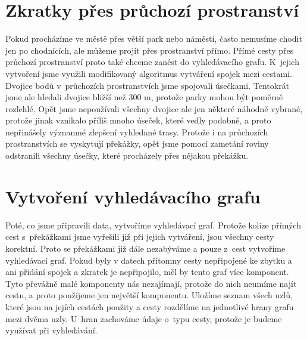 \section{Zkratky přes průchozí prostranství}
Pokud procházíme ve městě přes větší park nebo náměstí, často nemusíme chodit
jen po chodnících, ale můžeme projít přes prostranství přímo. Přímé cesty přes
průchozí prostranství proto také chceme zanést do vyhledávacího grafu. K~jejich
vytvoření jsme využili modifikovaný algoritmus vytváření spojek mezi cestami.
Dvojice bodů v~průchozích prostranstvích jsme spojovali úsečkami. Tentokrát jsme
ale hledali dvojice bližší než 300 m, protože parky mohou být poměrně rozlehlé.
Opět jsme nepoužívali všechny dvojice ale jen některé náhodně vybrané, protože
jinak vznikalo příliš mnoho úseček, které vedly podobně, a proto nepřinášely
významné zlepšení vyhledané trasy. Protože i na průchozích prostranstvích se
vyskytují překážky, opět jsme pomocí zametání roviny odstranili všechny úsečky,
které procházely přes nějakou překážku.

\section{Vytvoření vyhledávacího grafu}
Poté, co jsme připravili data, vytvoříme vyhledávací graf. Protože kolize
přímých cest s~překážkami jsme vyřešili již při jejich vytváření, jsou všechny
cesty korektní. Proto se překážkami již dále nezabýváme a pouze z~cest vytvoříme
vyhledávací graf. Pokud byly v datech přítomny cesty nepřipojené ke zbytku a ani 
přidání spojek a zkratek je nepřipojilo, měl by tento graf více komponent. Tyto
převážně malé komponenty nás nezajímají, protože do nich neumíme najít cestu, a
proto použijeme jen největší komponentu. Uložíme seznam všech uzlů, které jsou
na jejích cestách použity a cesty rozdělíme na jednotlivé hrany grafu mezi dvěma
uzly.  U~hran zachováme údaje o~typu cesty, protože je budeme využívat při
vyhledávání.
